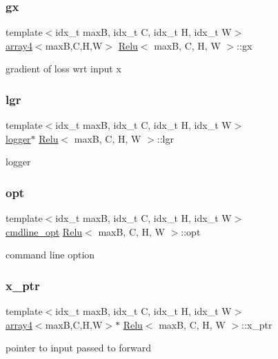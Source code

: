 \subsubsection{\texorpdfstring{gx}{gx}}
{\footnotesize\ttfamily template$<$idx\+\_\+t maxB, idx\+\_\+t C, idx\+\_\+t H, idx\+\_\+t W$>$ \\
\hyperlink{structarray4}{array4}$<$maxB,C,H,W$>$ \hyperlink{structRelu}{Relu}$<$ maxB, C, H, W $>$\+::gx}

gradient of loss wrt input x \mbox{\label{structRelu_af0064c033b32a241427e76c25b2eee41}} 
\subsubsection{\texorpdfstring{lgr}{lgr}}
{\footnotesize\ttfamily template$<$idx\+\_\+t maxB, idx\+\_\+t C, idx\+\_\+t H, idx\+\_\+t W$>$ \\
\hyperlink{structlogger}{logger}$\ast$ \hyperlink{structRelu}{Relu}$<$ maxB, C, H, W $>$\+::lgr}

logger \mbox{\label{structRelu_a63f877be5c3cf3b8c89b57dbf2da0e68}} 
\subsubsection{\texorpdfstring{opt}{opt}}
{\footnotesize\ttfamily template$<$idx\+\_\+t maxB, idx\+\_\+t C, idx\+\_\+t H, idx\+\_\+t W$>$ \\
\hyperlink{structcmdline__opt}{cmdline\+\_\+opt} \hyperlink{structRelu}{Relu}$<$ maxB, C, H, W $>$\+::opt}

command line option \mbox{\label{structRelu_a51ae894a609b5de1e41e8fd30ff5575c}} 
\subsubsection{\texorpdfstring{x\+\_\+ptr}{x\_ptr}}
{\footnotesize\ttfamily template$<$idx\+\_\+t maxB, idx\+\_\+t C, idx\+\_\+t H, idx\+\_\+t W$>$ \\
\hyperlink{structarray4}{array4}$<$maxB,C,H,W$>$$\ast$ \hyperlink{structRelu}{Relu}$<$ maxB, C, H, W $>$\+::x\+\_\+ptr}

pointer to input passed to forward \mbox{\label{structRelu_a30148be5eabe65c95a37c7cd0525c08a}} 
